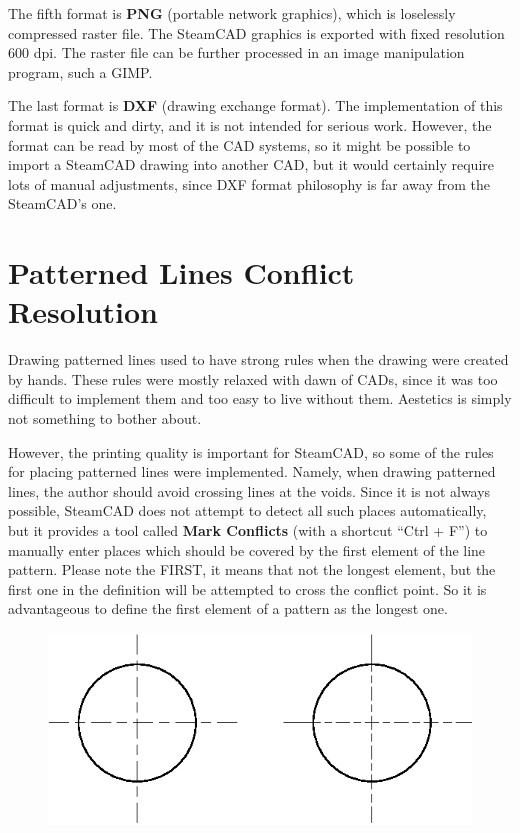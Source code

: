 The fifth format is \textbf{PNG} (portable network graphics), which is loselessly
compressed raster file. The SteamCAD graphics is exported with fixed resolution
600 dpi. The raster file can be further processed in an image manipulation
program, such a GIMP.

The last format is \textbf{DXF} (drawing exchange format). The implementation
of this format is quick and dirty, and it is not intended for serious work. However,
the format can be read by most of the CAD systems, so it might be possible to
import a SteamCAD drawing into another CAD, but it would certainly require lots
of manual adjustments, since DXF format philosophy is far away from the SteamCAD's
one.

\section{Patterned Lines Conflict Resolution}

Drawing patterned lines used to have strong rules when the drawing were created
by hands. These rules were mostly relaxed with dawn of CADs, since it was too
difficult to implement them and too easy to live without them. Aestetics is simply
not something to bother about.

However, the printing quality is important for SteamCAD, so some of the rules
for placing patterned lines were implemented. Namely, when drawing patterned
lines, the author should avoid crossing lines at the voids. Since it is not always
possible, SteamCAD does not attempt to detect all such places automatically, but
it provides a tool called \textbf{Mark Conflicts} (with a shortcut ``Ctrl + F'')
to manually enter places which should be covered by the first element of the
line pattern. Please note the FIRST, it means that not the longest element, but the
first one in the definition will be attempted to cross the conflict point. So
it is advantageous to define the first element of a pattern as the longest one.

\begin{figure}[h]
\begin{center}
\includegraphics[origin=c]{Images/Conflicts.eps}
\end{center}
\end{figure}

